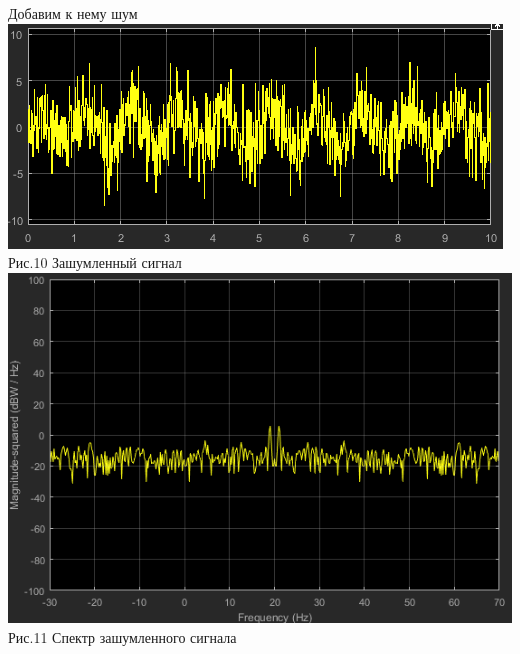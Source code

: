 \documentclass[a4paper,12pt]{article}
\begin{document}
Добавим к нему шум
\center\includegraphics{pictures/SimulShum.png} \\ Рис.10 Зашумленный сигнал
\center\includegraphics{pictures/SimulSpecShum.png} \\ Рис.11 Спектр зашумленного сигнала
\end{document}
